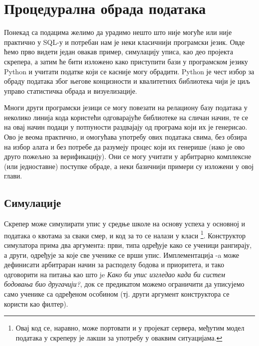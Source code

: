 \chapter{Процедурална обрада података}\label{ch:\thechapter}

Понекад са подацима желимо да урадимо нешто што није могуће или није практично у SQL-у и потребан нам је неки класичнији програмски језик. Овде ћемо прво видети један овакав пример, симулацију уписа, као део пројекта скрепера, а затим ће бити изложено како приступити бази у програмском језику Python и учитати податке који се касније могу обрадити. Python је чест избор за обраду података због његове концизности и квалитетних библиотека чији је циљ управо статистичка обрада и визуелизације. 

Многи други програмски језици се могу повезати на релациону базу података у неколико линија кода користећи одговарајуће библиотеке на сличан начин, те се на овај начин подаци у потпуности раздвајају од програма који их је генерисао. Ово је веома практично, и омогућава употребу ових података свима, без обзира на избор алата и без потребе да разумеју процес који их генерише (иако је ово друго пожељно за верификацију). Они се могу учитати у арбитрарно комплексне (или једноставне) поступке обраде, а неки базичнији примери су изложени у овој глави.

\section{Симулације}

Скрепер може симулирати упис у средње школе на основу успеха у основној и података о квотама за сваки смер, и код за то се налази у класи \footnote{Овај код се, наравно, може портовати и у пројекат сервера, међутим модел података у скреперу је лакши за употребу у оваквим ситуацијама.}. Конструктор симулатора прима два аргумента: први, типа  одређује како се ученици рангирају, а други,  одређује за које све ученике се врши упис. Имплементација -a може дефинисати арбитраран начин за расподелу бодова и приоритета, и тако одговорити на питања као што je \emph{Како би упис изгледао када би систем бодовања био другачији?}, док се предикатом можемо ограничити да уписујемо само ученике са одређеном особином (тј. други аргумент конструктора се користи као филтер). 

